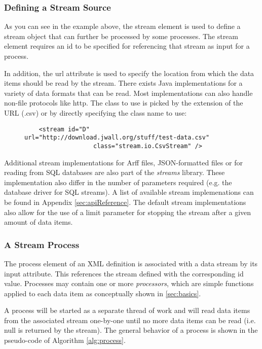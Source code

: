 \subsubsection{Defining a Stream Source}
As you can see in the example above, the {\ttfamily stream} element is used to define
a stream object that can further be processed by some processes. The {\ttfamily stream}
element requires an {\ttfamily id} to be specified for referencing that stream as input
for a process. 

In addition, the {\ttfamily url} attribute is used to specify the location
from which the data items should be read by the stream. There exists Java implementations
for a variety of data formats that can be read. Most implementations can also handle 
non-file protocols like {\ttfamily http}. The class to use is picked by the extension
of the URL ({\ttfamily .csv}) or by directly specifying the class name to use:
\begin{figure}[h!]{\footnotesize
\begin{verbatim}
    <stream id="D" url="http://download.jwall.org/stuff/test-data.csv"
                   class="stream.io.CsvStream" />
\end{verbatim}}
\end{figure}

Additional stream implementations for Arff files, JSON-formatted files or for reading 
from SQL databases are also part of the {\em streams} library. These implementation
also differ in the number of parameters required (e.g. the database driver for SQL
streams). A list of available stream implemenations can be found in Appendix \ref{sec:apiReference}.
The default stream implementations also allow for the use of a {\ttfamily limit} parameter
for stopping the stream after a given amount of data items.

\subsubsection{A Stream Process}
The {\ttfamily process} element of an XML definition is associated with a data stream
by its {\ttfamily input} attribute. This references the stream defined with the corresponding
{\ttfamily id} value. Processes may contain one or more {\em processors}, which are simple
functions applied to each data item as conceptually shown in \ref{sec:basics}.

A process will be started as a separate thread of work and will read data items from
the associated stream one-by-one until no more data items can be read (i.e. 
{\ttfamily null} is returned by the stream). The general behavior of a process is
shown in the pseudo-code of Algorithm \ref{alg:process}.

